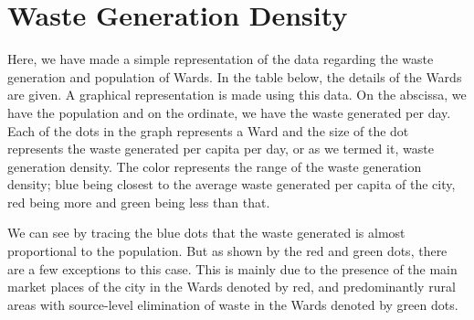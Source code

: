 \documentclass[12pt,a4paper]{  report}
\begin{document}
\section{Waste Generation Density}
\begin{justify}
	Here, we have made a simple representation of the data regarding the waste generation and population of Wards. In the table below, the details of the Wards are given. A graphical representation is made using this data. On the abscissa, we have the population and on the ordinate, we have the waste generated per day. Each of the dots in the graph represents a Ward and the size of the dot represents the waste generated per capita per day, or as we termed it, waste generation density. The color represents the range of the waste generation density; blue being closest to the average waste generated per capita of the city, red being more and green being less than that.
	
	
	
	We can see by tracing the blue dots that the waste generated is almost proportional to the population. But as shown by the red and green dots, there are a few exceptions to this case. This is mainly due to the presence of the main market places of the city in the Wards denoted by red, and predominantly rural areas with source-level elimination of waste in the Wards denoted by green dots.
	\vspace{1cm}
	

\end{justify}
\end{document}
